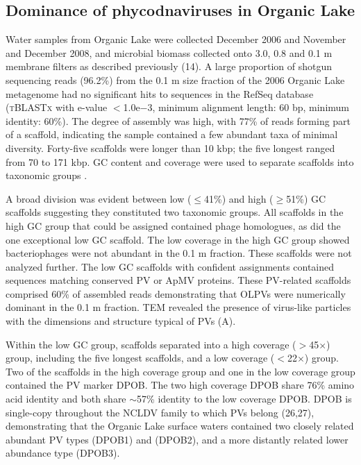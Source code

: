 \subsection{Dominance of phycodnaviruses in Organic Lake}
Water samples from Organic Lake were collected December 2006 and November and December 2008, and microbial biomass collected onto 3.0, 0.8 and 0.1 \textmu{}m membrane filters as described previously (14). 
A large proportion of shotgun sequencing reads (96.2\%) from the 0.1 \textmu{}m size fraction of the 2006 Organic Lake metagenome  had no significant hits to sequences in the RefSeq database 
(\textsc{tBLASTx} with e-value $<$1.0e$-$3, minimum alignment length: 60 bp, minimum identity: 60\%). 
The degree of assembly was high, with 77\% of reads forming part of a scaffold, indicating the sample contained a few abundant taxa of minimal diversity. 
Forty-five scaffolds were longer than 10 kbp; the five longest ranged from 70 to 171 kbp. 
GC content and coverage were used to separate scaffolds into taxonomic groups .
 
A broad division was evident between low ($\le$41\%) and high ($\ge$51\%) GC scaffolds suggesting they constituted two taxonomic groups. 
All scaffolds in the high GC group that could be assigned contained phage homologues, as did the one exceptional low GC scaffold. 
The low coverage in the high GC group showed bacteriophages were not abundant in the 0.1 \textmu{}m fraction. 
These scaffolds were not analyzed further. 
The low GC scaffolds with confident assignments contained sequences matching conserved \ac{PV} or \ac{ApMV} proteins. 
These \ac{PV}-related scaffolds comprised 60\% of assembled reads demonstrating that \acp{OLPV} were numerically dominant in the 0.1 \textmu{}m fraction. 
\ac{TEM} revealed the presence of virus-like particles with the dimensions and structure typical of PVs (A).


Within the low GC group, scaffolds separated into a high coverage ($>$45$\times$) group, including the five longest scaffolds, and a low coverage ($<$22$\times$) group. 
Two of the scaffolds in the high coverage group and one in the low coverage group contained the \ac{PV} marker \ac{DPOB}. 
The two high coverage \ac{DPOB} share 76\% amino acid identity and both share $\sim$57\% identity to the low coverage \ac{DPOB}. 
\ac{DPOB} is single-copy throughout the \ac{NCLDV} family to which \acp{PV} belong (26,27), 
demonstrating that the Organic Lake surface waters contained two closely related abundant \ac{PV} types (\ac{DPOB}1) and (\ac{DPOB}2), and a more distantly related lower abundance type (\ac{DPOB}3). 

